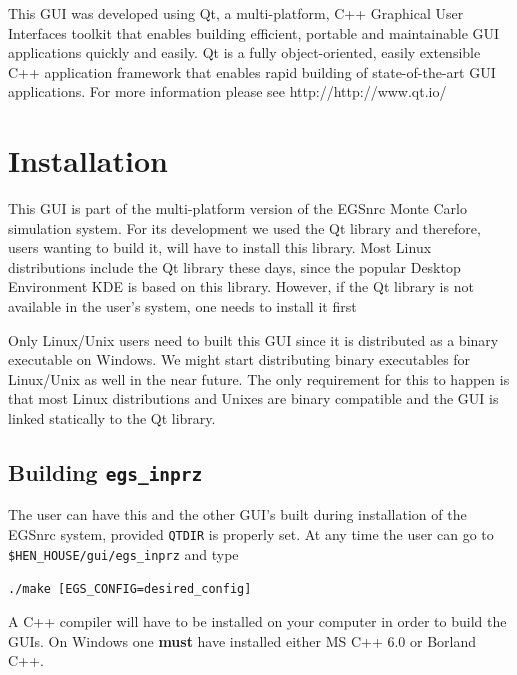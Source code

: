 \documentclass[12pt,twoside]{article}   %
\begin{document}
 This GUI was developed using Qt, a multi-platform, C++ Graphical User Interfaces toolkit
 that enables building efficient, portable and maintainable GUI applications 
 quickly and easily. Qt is a fully object-oriented, easily extensible C++ application  
 framework that enables rapid building of state-of-the-art GUI applications. For more
 information please see 
{http://http://www.qt.io/}


\newpage
\section{Installation}
\label{installation}


This GUI is part of the multi-platform version\cite{Ka03} 
of the EGSnrc Monte Carlo simulation system\cite{Ka09a}.
For its development we used the Qt library and therefore,
users wanting to build it, will have to install this library. Most Linux distributions include the
Qt library these days, since the popular Desktop Environment KDE is based on this library. However,
if the Qt library is not available in the user's system, one needs to install it first

Only Linux/Unix users need to built this GUI since it is distributed as a binary executable on
Windows. We might start distributing binary executables for Linux/Unix as well in the near future.
The only requirement for this to happen is that most Linux distributions and Unixes are binary
compatible and the GUI is linked statically to the Qt library.




\subsection{Building {\tt egs\_inprz}}
\label{building}

The user can have this and the other GUI's built during installation of the EGSnrc system,
provided {\tt QTDIR} is properly set. At any time the user can go to 
{\tt \$HEN\_HOUSE/gui/egs\_inprz} and type

      {\tt ./make [EGS\_CONFIG=desired\_config]}

\noindent A C++ compiler will have to be installed on
your computer in order to build the GUIs. 
On Windows one {\bf must} have installed either MS C++ 6.0 or Borland C++.
\end{document}
